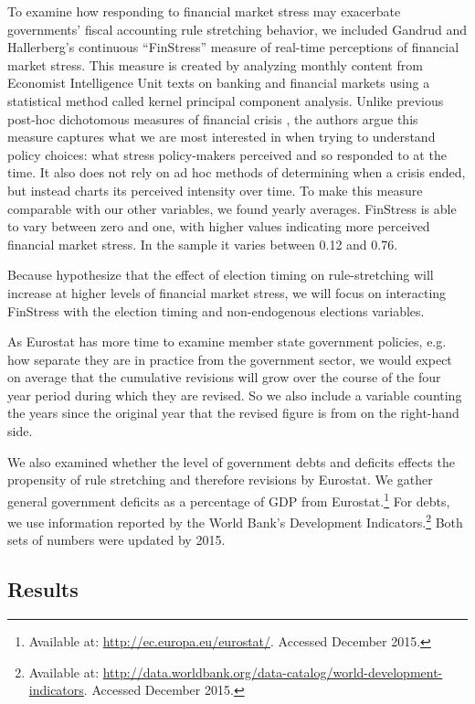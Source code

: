 \documentclass[]{article}
\begin{document}
To examine how responding to financial market stress may exacerbate governments' fiscal accounting rule stretching behavior, we included Gandrud and Hallerberg's \citeyearpar{finstress_paper} continuous ``FinStress'' measure of real-time perceptions of financial market stress. This measure is created by analyzing monthly content from Economist Intelligence Unit texts on banking and financial markets using a statistical method called kernel principal component analysis. Unlike previous post-hoc dichotomous measures of financial crisis \citep[e.g. measures compiled by][]{Laeven2012,ReinhartRog2010}, the authors argue this measure captures what we are most interested in when trying to understand policy choices: what stress policy-makers perceived and so responded to at the time. It also does not rely on ad hoc methods of determining when a crisis ended, but instead charts its perceived intensity over time. To make this measure comparable with our other variables, we found yearly averages. FinStress is able to vary between zero and one, with higher values indicating more perceived financial market stress. In the sample it varies between 0.12 and 0.76.

Because hypothesize that the effect of election timing on rule-stretching will increase at higher levels of financial market stress, we will focus on interacting FinStress with the election timing and non-endogenous elections variables.

As Eurostat has more time to examine member state government policies, e.g. how separate they are in practice from the government sector, we would expect on average that the cumulative revisions will grow over the course of the four year period during which they are revised. So we also include a variable counting the years since the original year that the revised figure is from on the right-hand side.

We also examined whether the level of government debts and deficits effects the propensity of rule stretching and therefore revisions by Eurostat. We gather general government deficits as a percentage of GDP from Eurostat.\footnote{Available at: \url{http://ec.europa.eu/eurostat/}. Accessed December 2015.} For debts, we use information reported by the World Bank's Development Indicators.\footnote{Available at: \url{http://data.worldbank.org/data-catalog/world-development-indicators}. Accessed December 2015.} Both sets of numbers were updated by 2015.

\subsection{Results}
\end{document}
